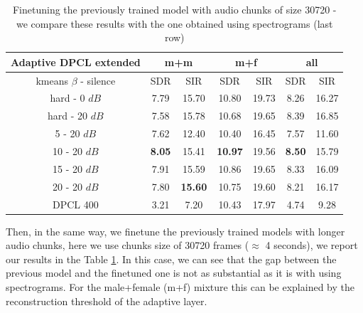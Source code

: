 \documentclass[master, tikz, final,11pt, dvipdfmx]{iscs-thesis}
\begin{document}
\begin{table}
\centering
\begin{tabular}{c|c|c|c|c|c|c}
Adaptive DPCL extended & \multicolumn{2}{c|}{m+m} & \multicolumn{2}{c|}{m+f} & \multicolumn{2}{c}{all} \\ 
\hline 
kmeans $\beta$ - silence & SDR & SIR & SDR & SIR & SDR & SIR \\ 
\hline 
hard - 0 $dB$ & 7.79 & 15.70 & 10.80 & 19.73 & 8.26 & 16.27 \\  
hard - 20 $dB$ & 7.58 & 15.78 & 10.68 & 19.65 & 8.39 & 16.85 \\ 
\hline 
\hline 
5 - 20 $dB$ & 7.62 & 12.40 & 10.40 & 16.45 & 7.57 & 11.60 \\ 
10 - 20 $dB$ & \textbf{8.05} & 15.41 & \textbf{10.97} & 19.56 & \textbf{8.50} & 15.79 \\ 
15 - 20 $dB$ & 7.91 & 15.59 & 10.86 & 19.65 & 8.33 & 16.09 \\ 
20 - 20 $dB$ & 7.80 & \textbf{15.60} & 10.75 & 19.60 & 8.21 & 16.17 \\ 
\hline 
\hline 
DPCL 400 & 3.21 & 7.20 & 10.43 & 17.97 & 4.74 & 9.28 \\ 
\end{tabular}
\captionsetup{justification=centering}
\caption{Finetuning the previously trained model with audio chunks of size 30720 - we compare these results with the one obtained using spectrograms (last row) }
\label{table:AdaptDPCLext}
\end{table}

Then, in the same way, we finetune the previously trained models with longer audio chunks, here we use chunks size of 30720 frames ($\approx$ 4 seconds), we report our results in the Table \ref{table:AdaptDPCLext}. In this case, we can see that the gap between the previous model and the finetuned one is not as substantial as it is with using spectrograms. For the male+female (m+f) mixture this can be explained by the reconstruction threshold of the adaptive layer.

\end{document}
